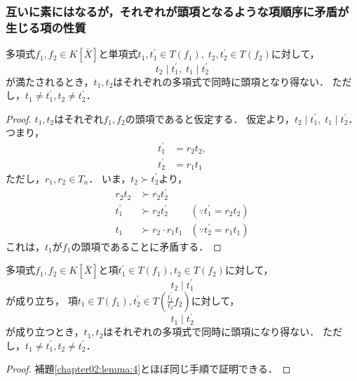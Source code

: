 \subsubsection{互いに素にはなるが，それぞれが頭項となるような項順序に矛盾が生じる項の性質}
\begin{lemma}
	\label{chapter02:lemma:4}
	多項式$f_1, f_2 \in K[\bar{X}]$と単項式$t_1, t_1^\prime \in T(f_1), \; t_2, t_2^\prime \in T(f_2)$に対して，
	$$t_2 \mid t_1^\prime, \; t_1 \mid t_2^\prime$$
	が満たされるとき，$t_1, t_2$はそれぞれの多項式で同時に頭項となり得ない．
	ただし，$t_1 \ne t_1^\prime, t_2 \ne t_2^\prime$．
\end{lemma}
\begin{proof}
	$t_1, t_2$はそれぞれ$f_1, f_2$の頭項であると仮定する．
	仮定より，$t_2 \mid t_1^\prime, \; t_1 \mid t_2^\prime$．
	つまり，
	\begin{align*}
		t_1^\prime &= r_2t_2, \\
		t_2^\prime &= r_1t_1
	\end{align*}
	ただし，$r_1, r_2 \in T_n$．
	いま，$t_2 \succ t_2^\prime$より，
	\begin{align*}
		r_2t_2 & \succ r_2t_2^\prime \\
		t_1^\prime & \succ r_2t_2^\prime & (\because t_1^\prime = r_2 t_2) \\
		t_1 & \succ r_2 \cdot r_1t_1 & (\because t_2^\prime = r_1t_1)
	\end{align*}
	これは，$t_1$が$f_1$の頭項であることに矛盾する．
\end{proof}
\begin{lemma}
\label{chapter02:lemma:5}
	多項式$f_1, f_2 \in K[\bar{X}]$と項$t_1^\prime \in T(f_1), t_2 \in T(f_2)$に対して，
	$$t_2 \mid t_1^\prime$$
	が成り立ち，
	項$t_1 \in T(f_1), t_2^\prime \in T(\frac{t_1^\prime}{t_2}f_2)$に対して，
	$$t_1 \mid t_2^\prime$$
	が成り立つとき，$t_1, t_2$はそれぞれの多項式で同時に頭項になり得ない．
	ただし，$t_1 \ne t_1^\prime, t_2 \ne t_2^\prime$．
\end{lemma}
\begin{proof}
	補題\ref{chapter02:lemma:4}とほぼ同じ手順で証明できる．
\end{proof}

